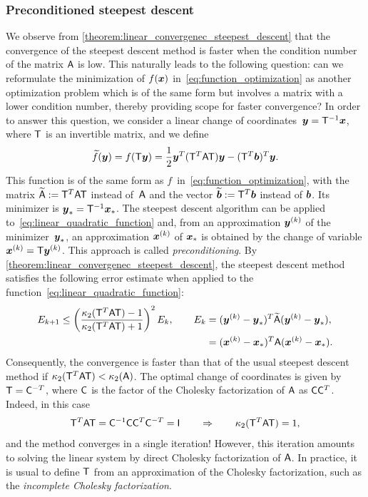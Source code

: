 \subsubsection{Preconditioned steepest descent}%
\label{ssub:preconditioned_steepest_descent}
We observe from \cref{theorem:linear_convergenec_steepest_descent} that the convergence of the steepest descent method is faster when
the condition number of the matrix $\mathsf A$ is low.
This naturally leads to the following question:
can we reformulate the minimization of $f(\mathbf{\boldsymbol{x}})$ in~\eqref{eq:function_optimization}
as another optimization problem which is of the same form
but involves a matrix with a lower condition number,
thereby providing scope for faster convergence?
In order to answer this question,
we consider a linear change of coordinates~$\mathbf{\boldsymbol{y}} = \mathsf T^{-1} \mathbf{\boldsymbol{x}}$,
where $\mathsf T$ is an invertible matrix,
and we define
\begin{equation}
    \label{eq:linear_quadratic_function}
    \widetilde f(\mathbf{\boldsymbol{y}}) = f(\mathsf T \mathbf{\boldsymbol{y}})
    = \frac{1}{2} \mathbf{\boldsymbol{y}}^T (\mathsf T^{T} \mathsf A \mathsf T) \mathbf{\boldsymbol{y}} - (\mathsf T^{T} \mathbf{\boldsymbol{b}})^{T} \mathbf{\boldsymbol{y}}.
\end{equation}
This function is of the same form as $f$~in~\eqref{eq:function_optimization},
with the matrix $\widetilde {\mathsf A} := \mathsf T^T \mathsf A \mathsf T$ instead of~$\mathsf A$ and the vector $\widetilde {\mathbf{\boldsymbol{b}}} := \mathsf T^{T} \mathbf{\boldsymbol{b}}$ instead of $\mathbf{\boldsymbol{b}}$.
Its minimizer is $\mathbf{\boldsymbol{y}}_* = \mathsf T^{-1} \mathbf{\boldsymbol{x}}_*$.
The steepest descent algorithm can be applied to~\eqref{eq:linear_quadratic_function} and,
from an approximation $\mathbf{\boldsymbol{y}}^{(k)}$ of the minimizer~$\mathbf{\boldsymbol{y}}_*$,
an approximation $\mathbf{\boldsymbol{x}}^{(k)}$ of $\mathbf{\boldsymbol{x}}_*$ is obtained by the change of variable $\mathbf{\boldsymbol{x}}^{(k)} = \mathsf T \mathbf{\boldsymbol{y}}^{(k)}$.
This approach is called \emph{preconditioning}.
By \cref{theorem:linear_convergenec_steepest_descent},
the steepest descent method
satisfies the following error estimate
when applied to the function~\eqref{eq:linear_quadratic_function}:
\begin{align*}
    E_{k+1}
    \leq
    \left(\frac{\kappa_2(\mathsf T^T \mathsf A \mathsf T) - 1}{\kappa_2(\mathsf T^T \mathsf A \mathsf T) + 1} \right)^2 E_k,
    \qquad E_{k} &= (\mathbf{\boldsymbol{y}}^{(k)} - \mathbf{\boldsymbol{y}}_*)^T \widetilde {\mathsf A} (\mathbf{\boldsymbol{y}}^{(k)} - \mathbf{\boldsymbol{y}}_*), \\
    &= (\mathbf{\boldsymbol{x}}^{(k)} - \mathbf{\boldsymbol{x}}_*)^T \mathsf A (\mathbf{\boldsymbol{x}}^{(k)} - \mathbf{\boldsymbol{x}}_*).
\end{align*}
Consequently, the convergence is faster than that of the usual steepest descent method if $\kappa_2(\mathsf T^T \mathsf A \mathsf T) < \kappa_2(\mathsf A)$.
The optimal change of coordinates is given by $\mathsf T = \mathsf C^{-T}$,
where $\mathsf C$ is the factor of the Cholesky factorization of $\mathsf A$ as $\mathsf C \mathsf C^T$.
Indeed, in this case
\[
    \mathsf T^T \mathsf A \mathsf T = \mathsf C^{-1} \mathsf C \mathsf C^T \mathsf C^{-T} = \mathsf I
    \qquad \Rightarrow \qquad
    \kappa_2(\mathsf T^T \mathsf A \mathsf T) = 1,
\]
and the method converges in a single iteration!
However,
this iteration amounts to solving the linear system by direct Cholesky factorization of $\mathsf A$.
In practice, it is usual to define $\mathsf T$ from an approximation of the Cholesky factorization,
such as the \emph{incomplete Cholesky factorization}.

